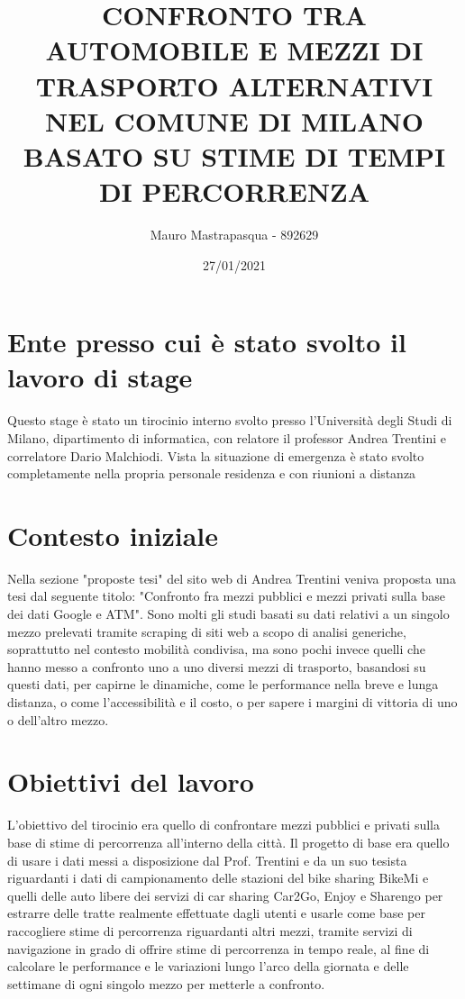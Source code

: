 \documentclass[a4paper,11pt]{article}
\title{{\Large\textbf{CONFRONTO TRA AUTOMOBILE E MEZZI DI TRASPORTO ALTERNATIVI NEL COMUNE DI MILANO BASATO SU STIME DI TEMPI DI PERCORRENZA}}}
\author{\LARGE{Mauro Mastrapasqua - 892629}}
\date{\Large{27/01/2021}}
\begin{document}
	\maketitle
	\vspace{1cm}
	
\section{Ente presso cui è stato svolto il lavoro di stage}

\large{
Questo stage è stato un tirocinio interno svolto presso l'Università degli Studi di Milano, dipartimento di informatica, con relatore il professor Andrea Trentini e correlatore Dario Malchiodi. Vista la situazione di emergenza è stato svolto completamente nella propria personale residenza e con riunioni a distanza
}

\section{Contesto iniziale}

\large{
Nella sezione "proposte tesi" del sito web di Andrea Trentini veniva proposta una tesi dal seguente titolo: "Confronto fra mezzi pubblici e mezzi privati sulla base dei dati Google e ATM". Sono molti gli studi basati su dati relativi a un singolo mezzo prelevati tramite scraping di siti web a scopo di analisi generiche, soprattutto nel contesto mobilità condivisa, ma sono pochi invece quelli che hanno messo a confronto uno a uno diversi mezzi di trasporto, basandosi su questi dati, per capirne le dinamiche, come le performance nella breve e lunga distanza, o come l'accessibilità e il costo, o per sapere i margini di vittoria di uno o dell'altro mezzo.
}

\section{Obiettivi del lavoro}

\large{
L'obiettivo del tirocinio era quello di confrontare mezzi pubblici e privati sulla base di stime di percorrenza all'interno della città. Il progetto di base era quello di usare i dati messi a disposizione dal Prof. Trentini e da un suo tesista riguardanti i dati di campionamento delle stazioni del bike sharing BikeMi e quelli delle auto libere dei servizi di car sharing Car2Go, Enjoy e Sharengo per estrarre delle tratte realmente effettuate dagli utenti e usarle come base per raccogliere stime di percorrenza riguardanti altri mezzi, tramite servizi di navigazione in grado di offrire stime di percorrenza in tempo reale, al fine di calcolare le performance e le variazioni lungo l'arco della giornata e delle settimane di ogni singolo mezzo per metterle a confronto.
}
\end{document}
